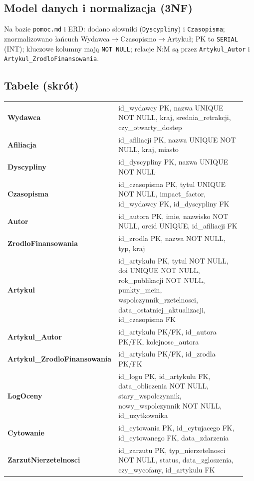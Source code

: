 \documentclass[12pt,a4paper]{article}
\begin{document}
\subsection{Model danych i normalizacja (3NF)}
Na bazie \texttt{pomoc.md} i ERD: dodano słowniki (\texttt{Dyscypliny}) i \texttt{Czasopisma}; znormalizowano łańcuch Wydawca$\rightarrow$Czasopismo$\rightarrow$Artykuł; PK to \texttt{SERIAL} (INT); kluczowe kolumny mają \texttt{NOT NULL}; relacje N:M są przez \texttt{Artykul\_Autor} i \texttt{Artykul\_ZrodloFinansowania}.

\subsection{Tabele (skrót)}
\begin{longtable}{p{0.25\linewidth}p{0.7\linewidth}}
\textbf{Wydawca} & id\_wydawcy PK, nazwa UNIQUE NOT NULL, kraj, srednia\_retrakcji, czy\_otwarty\_dostep \\
\textbf{Afiliacja} & id\_afiliacji PK, nazwa UNIQUE NOT NULL, kraj, miasto \\
\textbf{Dyscypliny} & id\_dyscypliny PK, nazwa UNIQUE NOT NULL \\
\textbf{Czasopisma} & id\_czasopisma PK, tytul UNIQUE NOT NULL, impact\_factor, id\_wydawcy FK, id\_dyscypliny FK \\
\textbf{Autor} & id\_autora PK, imie, nazwisko NOT NULL, orcid UNIQUE, id\_afiliacji FK \\
\textbf{ZrodloFinansowania} & id\_zrodla PK, nazwa NOT NULL, typ, kraj \\
\textbf{Artykul} & id\_artykulu PK, tytul NOT NULL, doi UNIQUE NOT NULL, rok\_publikacji NOT NULL, punkty\_mein, wspolczynnik\_rzetelnosci, data\_ostatniej\_aktualizacji, id\_czasopisma FK \\
\textbf{Artykul\_Autor} & id\_artykulu PK/FK, id\_autora PK/FK, kolejnosc\_autora \\
\textbf{Artykul\_ZrodloFinansowania} & id\_artykulu PK/FK, id\_zrodla PK/FK \\
\textbf{LogOceny} & id\_logu PK, id\_artykulu FK, data\_obliczenia NOT NULL, stary\_wspolczynnik, nowy\_wspolczynnik NOT NULL, id\_uzytkownika \\
\textbf{Cytowanie} & id\_cytowania PK, id\_cytujacego FK, id\_cytowanego FK, data\_zdarzenia \\
\textbf{ZarzutNierzetelnosci} & id\_zarzutu PK, typ\_nierzetelnosci NOT NULL, status, data\_zgloszenia, czy\_wycofany, id\_artykulu FK \\
\end{longtable}
\end{document}
